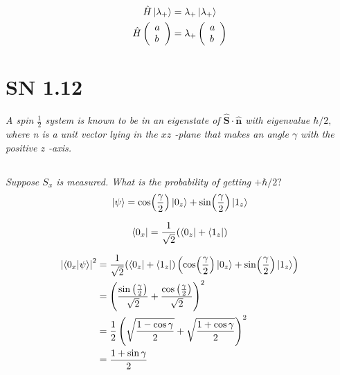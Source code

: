 \documentclass{article}
\begin{document}
\begin{align*}
    \hat{H} \ket{\lambda_+} &= \lambda_+ \ket{\lambda_+}\\
    \hat{H} \left(\begin{array}{l}
        a \\
        b
        \end{array}\right) &= \lambda_+ \left(\begin{array}{l}
        a \\
        b
        \end{array}\right)\\
\end{align*}



\newpage

\section{SN 1.12}
\textit{A spin $\frac{1}{2}$ system is known to be in an eigenstate of $\hat{\mathbf{S}} \cdot \hat{\mathbf{n}}$ with eigenvalue $\hbar / 2,$ where n is a unit vector lying in the $x z$ -plane that makes an angle $\gamma$ with the positive $z$ -axis.}
\subsection{}
\textit{Suppose $S_{x}$ is measured. What is the probability of getting $+\hbar / 2 ?$}
$$\ket{\psi} = \cos (\frac{\gamma }{2}) \ket{0_z} + \sin (\frac{\gamma }{2}) \ket{1_z}$$

$$ \bra{0_x} =  \frac{1}{\sqrt{2}}(\bra{0_z} + \bra{1_z})$$


\begin{align*}
\left|\braket{0_x}{\psi}\right|^2 &= \frac{1}{\sqrt{2}}(\bra{0_z} + \bra{1_z}) \left( \cos (\frac{\gamma }{2}) \ket{0_z} + \sin (\frac{\gamma }{2}) \ket{1_z}\right)\\
&= \left(\frac{\sin \left(\frac{\gamma }{2}\right)}{\sqrt{2}}+\frac{\cos \left(\frac{\gamma }{2}\right)}{\sqrt{2}}\right)^2\\
&= \frac{1}{2}\left(\sqrt{\frac{1-\cos \gamma}{2}}+\sqrt{\frac{1+\cos \gamma}{2}}\right)^{2}\\
&= \frac{1+\sin \gamma}{2}\\
\end{align*}
\end{document}
